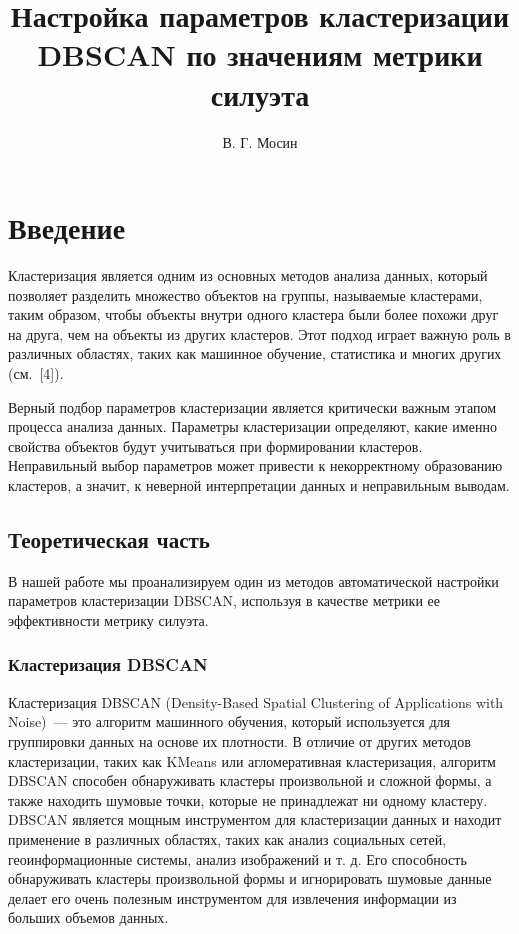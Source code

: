 \documentclass[a4paper,12pt]{article}
\title{Настройка параметров кластеризации DBSCAN по значениям метрики силуэта }
\author{В. Г. Мосин}
\date{}
\begin{document}
	\maketitle
	
\tableofcontents
	
\section{Введение}
Кластеризация является одним из основных методов анализа данных, который позволяет разделить множество объектов на группы, называемые кластерами, таким образом, чтобы объекты внутри одного кластера были более похожи друг на друга, чем на объекты из других кластеров. Этот подход играет важную роль в различных областях, таких как машинное обучение, статистика и многих других (см. [4]).

Верный подбор параметров кластеризации является критически важным этапом процесса анализа данных. Параметры кластеризации определяют, какие именно свойства объектов будут учитываться при формировании кластеров. Неправильный выбор параметров может привести к некорректному образованию кластеров, а значит, к неверной интерпретации данных и неправильным выводам.


\subsection{Теоретическая часть}

В нашей работе мы проанализируем один из методов автоматической настройки параметров кластеризации DBSCAN, используя в качестве метрики ее эффективности метрику силуэта.

\subsubsection{Кластеризация DBSCAN}

Кластеризация DBSCAN (Density-Based Spatial Clustering of Applications with Noise) — это алгоритм машинного обучения, который используется для группировки данных на основе их плотности. В отличие от других методов кластеризации, таких как KMeans или агломеративная кластеризация, алгоритм DBSCAN способен обнаруживать кластеры произвольной и сложной формы, а также находить шумовые точки, которые не принадлежат ни одному кластеру. DBSCAN является мощным инструментом для кластеризации данных и находит применение в различных областях, таких как анализ социальных сетей, геоинформационные системы, анализ изображений и т. д. Его способность обнаруживать кластеры произвольной формы и игнорировать шумовые данные делает его очень полезным инструментом для извлечения информации из больших объемов данных.
\end{document}
